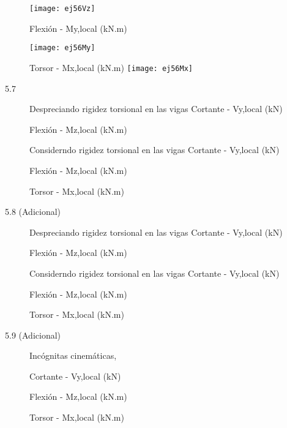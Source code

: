 \begin{description}
	\texttt{[image: ej56Vz]}


Flexión - My,local (kN.m)

	\texttt{[image: ej56My]}

Torsor - Mx,local (kN.m)
	\texttt{[image: ej56Mx]}


\item[5.7]

Despreciando rigidez torsional en las vigas
Cortante - Vy,local (kN)

Flexión - Mz,local (kN.m)


Considerndo rigidez torsional en las vigas
Cortante - Vy,local (kN)

Flexión - Mz,local (kN.m)

Torsor - Mx,local (kN.m)

\item[5.8 (Adicional)]

Despreciando rigidez torsional en las vigas
Cortante - Vy,local (kN)

Flexión - Mz,local (kN.m)


Considerndo rigidez torsional en las vigas
Cortante - Vy,local (kN)

Flexión - Mz,local (kN.m)


Torsor - Mx,local (kN.m)


\item[5.9 (Adicional)]


Incógnitas cinemáticas,




Cortante - Vy,local (kN)



Flexión - Mz,local (kN.m)

Torsor - Mx,local (kN.m)

\end{description}


%
%
%
%
%
%
%
%
%
%
%
%
%
%
%
%
%
%
%
%
%
%
%
%
%
%
%
%
%
%
%
%
%
%
%
%
%
%
%
%
%


